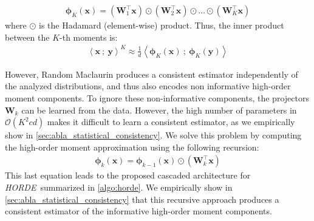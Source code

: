 \documentclass[10pt,twocolumn,letterpaper]{article}
\def\vx{{\bm{x}}}
\def\vy{{\bm{y}}}
\def\mW{{\bm{W}}}
\def\ourmethod{\textit{HORDE}}
\begin{document}
        \begin{align}\label{eq:maclaurin}
            \boldsymbol{\phi}_K(\vx) = \left( \mW_1^\top \vx \right) \odot \left( \mW_2^\top \vx \right) \odot \dots \odot \left( \mW_K^\top \vx \right)
        \end{align}
        where $\odot$ is the Hadamard (element-wise) product.
        Thus, the inner product between the $K$-th moments is:
        \begin{align}
            \left<\vx \ ; \ \vy \right>^K \approx \frac{1}{d} \left<\boldsymbol{\phi}_K(\vx) \ ; \ \boldsymbol{\phi}_K(\vy) \right>
        \end{align}
        
        However, Random Maclaurin produces a consistent estimator independently of the analyzed distributions, and thus also encodes non informative high-order moment components.
        To ignore these non-informative components, the projectors $\mW_k$ can be learned from the data.
        However, the high number of parameters in $\mathcal{O}(K^2cd)$ makes it difficult to learn a consistent estimator, as we empirically show in \autoref{sec:abla_statistical_consistency}.
        We solve this problem by computing the high-order moment approximation using the following recursion:
        \begin{align}\label{eq:cascaded_computation}
            \boldsymbol{\phi}_k(\vx) = \boldsymbol{\phi}_{k-1}(\vx) \odot \left(\mW_k^\top \vx\right)
        \end{align}
        This last equation leads to the proposed cascaded architecture for \ourmethod \ summarized in \autoref{algo:horde}.
We empirically show in \autoref{sec:abla_statistical_consistency} that this recursive approach produces a consistent estimator of the informative high-order moment components.
        
\end{document}
